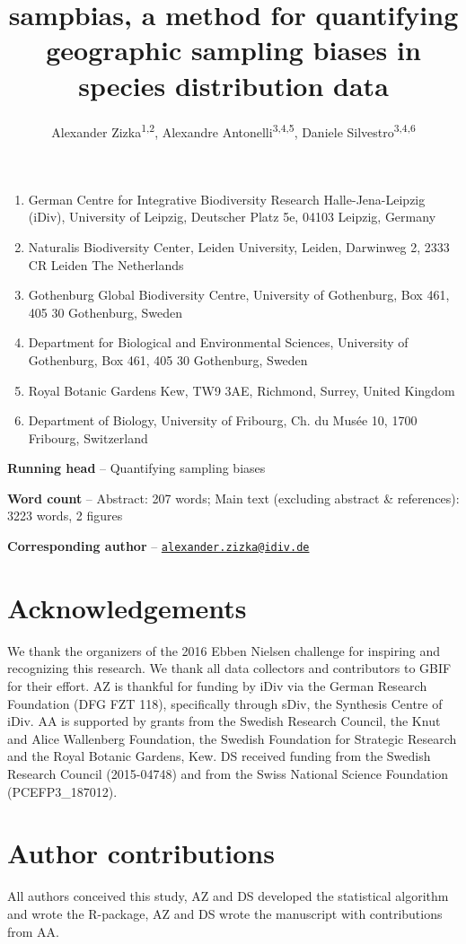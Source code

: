 \documentclass[
  12pt,
]{article}
\title{sampbias, a method for quantifying geographic sampling biases in species distribution data}
\author{Alexander Zizka\textsuperscript{1,2}, Alexandre Antonelli\textsuperscript{3,4,5}, Daniele Silvestro\textsuperscript{3,4,6}}
\date{}
\providecommand{\tightlist}{%
  \setlength{\itemsep}{0pt}\setlength{\parskip}{0pt}}
\begin{document}
\maketitle

\begin{enumerate}
\def\labelenumi{\arabic{enumi}.}
\tightlist
\item
  German Centre for Integrative Biodiversity Research Halle-Jena-Leipzig (iDiv), University of Leipzig, Deutscher Platz 5e, 04103 Leipzig, Germany
\item
  Naturalis Biodiversity Center, Leiden University, Leiden, Darwinweg 2, 2333 CR Leiden The Netherlands
\item
  Gothenburg Global Biodiversity Centre, University of Gothenburg, Box 461, 405 30 Gothenburg, Sweden
\item
  Department for Biological and Environmental Sciences, University of Gothenburg, Box 461, 405 30 Gothenburg, Sweden
\item
  Royal Botanic Gardens Kew, TW9 3AE, Richmond, Surrey, United Kingdom
\item
  Department of Biology, University of Fribourg, Ch. du Musée 10, 1700 Fribourg, Switzerland
\end{enumerate}

\textbf{Running head} -- Quantifying sampling biases

\textbf{Word count} -- Abstract: 207 words; Main text (excluding abstract \& references): 3223 words, 2 figures

\textbf{Corresponding author} -- \href{mailto:alexander.zizka@idiv.de}{\nolinkurl{alexander.zizka@idiv.de}}

\hypertarget{acknowledgements}{%
\section{Acknowledgements}\label{acknowledgements}}

We thank the organizers of the 2016 Ebben Nielsen challenge for inspiring and recognizing this research. We thank all data collectors and contributors to GBIF for their effort. AZ is thankful for funding by iDiv via the German Research Foundation (DFG FZT 118), specifically through sDiv, the Synthesis Centre of iDiv. AA is supported by grants from the Swedish Research Council, the Knut and Alice Wallenberg Foundation, the Swedish Foundation for Strategic Research and the Royal Botanic Gardens, Kew. DS received funding from the Swedish Research Council (2015-04748) and from the Swiss National Science Foundation (PCEFP3\_187012).

\hypertarget{author-contributions}{%
\section{Author contributions}\label{author-contributions}}

All authors conceived this study, AZ and DS developed the statistical algorithm and wrote the R-package, AZ and DS wrote the manuscript with contributions from AA.
\end{document}
